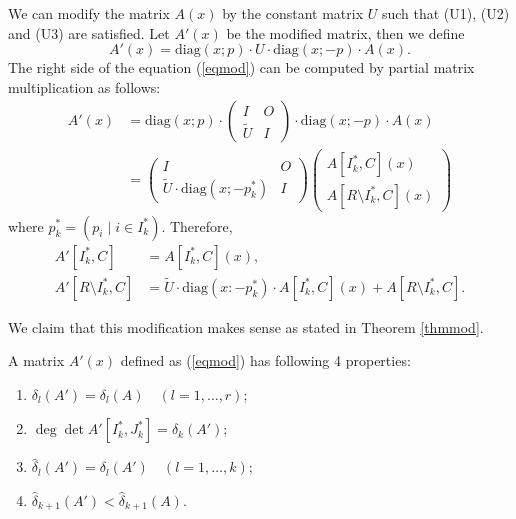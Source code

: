 We can modify the matrix $ A(x) $ by the constant matrix $U$ 
such that (U1), (U2) and (U3) are satisfied.
Let $ A'(x) $ be the modified matrix, then we define 
\begin{equation}
A'(x) = \mathrm{diag} (x;p) \cdot U \cdot \mathrm{diag} (x;-p) \cdot A(x). \label{eqmod}
\end{equation}
The right side of the equation (\ref{eqmod}) can be computed 
by partial matrix multiplication as follows:
\begin{align}
A'(x)
&= \mathrm{diag} (x;p) \cdot \left( \begin{array}{cc} I & O \\ \tilde{U} & I \end{array} \right) \cdot  \mathrm{diag} (x;-p) \cdot A(x) \\
&= \left( \begin{array}{cc} I & O \\ \tilde{U} \cdot \mathrm{diag} (x;-p^{\ast}_k) & I \end{array} \right)  \left( \begin{array}{c} A[I^{\ast}_k ,C] (x) \\ A[ R \setminus I^{\ast}_k ,C] (x) \end{array} \right)
\end{align}
where $p^{\ast}_k = ( p_i \mid i \in I^{\ast}_k)$. Therefore, 
\begin{align}
A'[I^{\ast}_k,C] &= A[I^{\ast}_k ,C] (x), \label{eqinv}\\
A'[R \setminus I^{\ast}_k ,C] &= \tilde{U} \cdot \mathrm{diag} (x:-p^{\ast}_k) \cdot A[ I^{\ast}_k,C] (x) + A[R \setminus I^{\ast}_k ,C ] .
\end{align}

We claim that this modification makes sense as stated in Theorem \ref{thmmod}.

\begin{theorem}
A matrix $ A'(x) $ defined as (\ref{eqmod}) has following 4 properties:
\begin{enumerate}
\item $ \delta_l (A') = \delta_l (A) \quad ( l = 1 ,\dots,r) $;
\item $ \deg \det A' [ I^{\ast}_k,J^{\ast}_k] = \delta_k (A')$;
\item $ \hat{\delta}_l (A') = \delta_l (A') \quad ( l = 1,\dots ,k)$;
\item $ \hat{\delta}_{k+1} (A') < \hat{\delta}_{k+1} (A) $.
\end{enumerate}
\label{thmmod}
\end{theorem}

